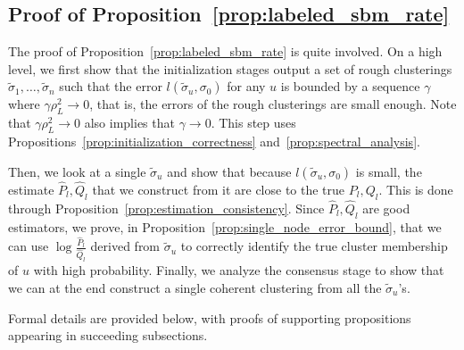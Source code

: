 

\subsection{Proof of Proposition~\ref{prop:labeled_sbm_rate}}

The proof of Proposition~\ref{prop:labeled_sbm_rate} is quite involved. On a high level, we first show that the initialization stages output a set of rough clusterings $\tilde{\sigma}_1, \dots, \tilde{\sigma}_n$ such that the error $l(\tilde{\sigma}_u, \sigma_0)$ for any $u$ is bounded by a sequence $\gamma$ where $\gamma \rho_L^2 \rightarrow 0$, that is, the errors of the rough clusterings are small enough. Note that $\gamma \rho_L^2 \rightarrow 0$ also implies that $\gamma \rightarrow 0$. This step uses Propositions~\ref{prop:initialization_correctness} and~\ref{prop:spectral_analysis}.

Then, we look at a single $\tilde{\sigma}_u$ and show that because $l(\tilde{\sigma}_u, \sigma_0)$ is small, the estimate $\hat{P}_l, \hat{Q}_l$ that we construct from it are close to the true $P_l, Q_l$. This is done through Proposition~\ref{prop:estimation_consistency}. Since $\hat{P}_l, \hat{Q}_l$ are good estimators, we prove, in Proposition~\ref{prop:single_node_error_bound}, that we can use $\log \frac{\hat{P}_l}{\hat{Q}_l}$ derived from $\tilde{\sigma}_u$ to correctly identify the true cluster membership of $u$ with high probability. Finally, we analyze the consensus stage to show that we can at the end construct a single coherent clustering from all the $\tilde{\sigma}_u$'s.

Formal details are provided below, with proofs of supporting propositions appearing in succeeding subsections.

